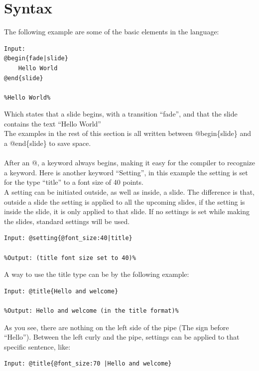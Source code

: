 \chapter{Syntax}
\label{SSyntax}
The following example are some of the basic elements in the language:
\begin{lstlisting}[frame=single]
Input:
@begin{fade|slide}
    Hello World
@end{slide}

%Hello World%
\end{lstlisting}

Which states that a slide begins, with a transition ``fade'', and that the slide contains the text ``Hello World'' \\
The examples in the rest of this section is all written between @begin\{slide\} and a @end\{slide\} to save space.
\\ \\
After an @, a keyword always begins, making it easy for the compiler to recognize a keyword.
Here is another keyword ``Setting'', in this example the setting is set for the type ``title'' to a font size of 40 points. \\
A setting can be initiated outside, as well as inside, a slide. The difference is that, outside a slide the setting is applied to all the upcoming slides, if the setting is inside the slide, it is only applied to that slide. If no settings is set while making the slides, standard settings will be used.

\begin{lstlisting}[frame=single]
Input: @setting{@font_size:40|title}

%Output: (title font size set to 40)%
\end{lstlisting}

A way to use the title type can be by the following example:\\

\begin{lstlisting}[frame=single]
Input: @title{Hello and welcome}

%Output: Hello and welcome (in the title format)%
\end{lstlisting}

As you see, there are nothing on the left side of the pipe (The sign before ``Hello''). Between the left curly and the pipe, settings can be applied to that specific sentence, like:\\

\begin{lstlisting}[frame=single]
Input: @title{@font_size:70 |Hello and welcome}
\end{lstlisting}

